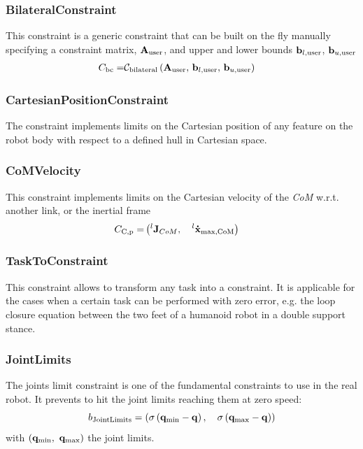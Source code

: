 \subsubsection{BilateralConstraint}
This constraint is a generic constraint that can be built on the fly manually specifying a constraint matrix, $\mathbf{A}_\text{user}$, and upper and lower bounds $\mathbf{b}_{l,\text{user}}$, $\mathbf{b}_{u,\text{user}}$
\begin{eqnarray}
C_{\text{bc}} = & \mathcal{C}_\text{bilateral} \left( \mathbf{A}_\text{user},\, \mathbf{b}_{l,\text{user}} ,\, \mathbf{b}_{u,\text{user}} \right)
\end{eqnarray}

\subsubsection{CartesianPositionConstraint}
The constraint implements limits on the Cartesian position of any feature on the robot body with respect to a defined hull in Cartesian space.

\subsubsection{CoMVelocity}
This constraint implements limits on the Cartesian velocity of the \emph{CoM} w.r.t. another link, or the inertial frame
\begin{eqnarray}
C_\text{C,p} = & \left( ^{l}\mathbf{J}_{CoM}, \quad ^{l}\mathbf{\dot{x}}_{\text{max,CoM}} \right)
\end{eqnarray}


\subsubsection{TaskToConstraint}
This constraint allows to transform any task into a constraint. It is applicable for the cases when a certain task can be performed with zero error, e.g. the loop closure equation between the two feet of a humanoid robot in a double support stance.

\subsubsection{JointLimits}
The joints limit constraint is one of the fundamental constraints to use in the real robot. It prevents to hit the joint limits reaching them at zero speed: 
\begin{equation}
b_\text{JointLimits} = (\sigma\left( \mathbf{q}_\text{min} - \mathbf{q} \right),\quad \sigma\left( \mathbf{q}_\text{max} - \mathbf{q} \right))
\end{equation}
with $\left(\mathbf{q}_\text{min}, \ \mathbf{q}_\text{max} \right)$ the joint limits.


